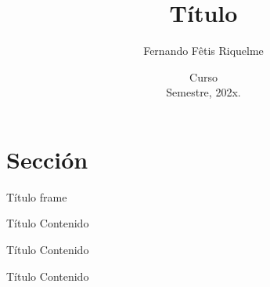 \documentclass{beamer}
\title{Título}
\author{Fernando Fêtis Riquelme}
\date{Curso\\Semestre, 202x.}
\begin{document}
\frame{\titlepage}

\section{Sección}


\begin{frame}{Título frame}

\begin{block}{Título}
Contenido
\end{block}

\begin{exampleblock}{Título}
Contenido
\end{exampleblock}

\begin{alertblock}{Título}
Contenido
\end{alertblock}

\end{frame}
\end{document}
